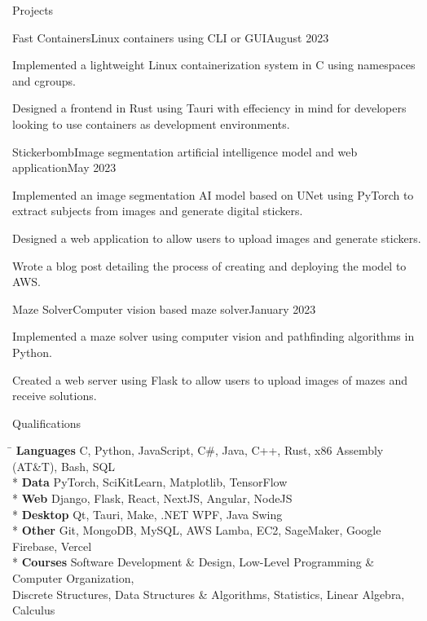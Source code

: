 \documentclass{article}
\newlength{\secsep}
\newenvironment{tabbedsection}[1]{
  \begin{list}{}{
      \setlength{\itemsep}{0pt}
      \setlength{\labelsep}{0pt}
      \setlength{\labelwidth}{0pt}
      \setlength{\leftmargin}{0pt}
      \setlength{\rightmargin}{0pt}
      \setlength{\listparindent}{0pt}
      \setlength{\parsep}{0pt}
      \setlength{\parskip}{0pt}
      \setlength{\partopsep}{0pt}
      \setlength{\topsep}{#1}
    }
  \item[]
}{\end{list}}
\newenvironment{nospacetabbing}{
    \begin{tabbing}
}{\end{tabbing}\vspace{-1.6pt}}
\newenvironment{resume_section}[1]{
  \filbreak
  \vspace{\secsep}
  {\color {MyDarkBlue}\textbf {\underline{#1}}}
  \begin{tabbedsection}{\secsep}
}{\end{tabbedsection}}
\newenvironment{subitems}{
  \renewcommand{\labelitemi}{-}
  \begin{itemize}
      \setlength{\labelsep}{1em}
}{\end{itemize}}
\newenvironment{resume_employer}[4]{
  \vspace{\secsep}
  \textbf{#1} \\ 
  \textnormal{#2} \hfill {#3 (#4)}{\parfillskip=0pt\par}
  \begin{tabbedsection}{0pt}
  \begin{subitems}
}{\end{subitems}\end{tabbedsection}}
\begin{document}
\begin{resume_section}{Projects}
  \begin{resume_employer}{Fast Containers}{Linux containers using CLI or GUI}{}{August 2023}
    \item Implemented a lightweight Linux containerization system in C using namespaces and cgroups.
    \item Designed a frontend in Rust using Tauri with effeciency in mind for developers looking to use containers as development environments.
  \end{resume_employer}
   
  \begin{resume_employer}{Stickerbomb}{Image segmentation artificial intelligence model and web application}{}{May 2023}
    \item Implemented an image segmentation AI model based on UNet using PyTorch to extract subjects from images and generate digital stickers.
    \item Designed a web application to allow users to upload images and generate stickers.
    \item Wrote a blog post detailing the process of creating and deploying the model to AWS.
  \end{resume_employer}

  \begin{resume_employer}{Maze Solver}{Computer vision based maze solver}{}{January 2023}
    \item Implemented a maze solver using computer vision and pathfinding algorithms in Python.
    \item Created a web server using Flask to allow users to upload images of mazes and receive solutions.
  \end{resume_employer}
\end{resume_section}

\begin{resume_section}{Qualifications}
  \begin {nospacetabbing}
      \hspace{2.5cm} \= \kill
      \textbf{Languages} \>C, Python, JavaScript, C\#, Java, C++, Rust, x86 Assembly (AT\&T), Bash, SQL\\* 
      \textbf{Data} \> PyTorch, SciKitLearn, Matplotlib, TensorFlow\\*
      \textbf{Web} \> Django, Flask, React, NextJS, Angular, NodeJS\\*
      \textbf{Desktop} \> Qt, Tauri, Make, .NET WPF, Java Swing\\*
      \textbf{Other} \> Git, MongoDB, MySQL, AWS Lamba, EC2, SageMaker, Google Firebase, Vercel \\*
      \textbf{Courses} \> Software Development \& Design, Low-Level Programming \& Computer Organization, \\
      \> Discrete Structures, Data Structures \& Algorithms, Statistics, Linear Algebra, Calculus
  \end {nospacetabbing}
\end{resume_section}
\end{document}
